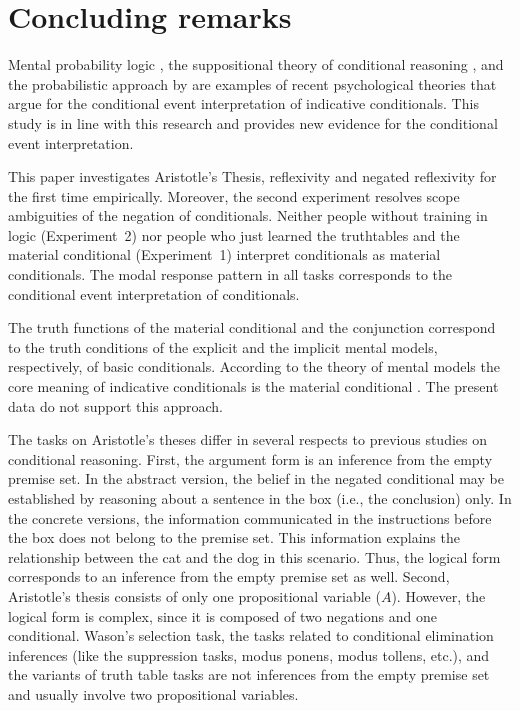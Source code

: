 \documentclass[11pt]{article}
\begin{document}
\section[Concluding remarks]{Concluding remarks}
Mental probability logic \cite{pfeifer05a,pfeifer09b}, the
suppositional theory of conditional reasoning \cite{evans04}, and the
probabilistic approach by  are examples of
recent psychological  theories that argue for the conditional event interpretation of
indicative conditionals. This study is in line with this research and
provides new evidence for the conditional event interpretation.

This paper investigates Aristotle's Thesis, reflexivity and negated
reflexivity for the first time empirically.  Moreover, the second experiment
resolves scope ambiguities of the negation of conditionals.  Neither people
without training in logic (Experiment~2) nor people who just learned
the truthtables and the material conditional (Experiment~1) interpret
conditionals as material conditionals. The modal response pattern in
all tasks corresponds to the conditional event interpretation of
conditionals.


The truth functions of the material conditional and the conjunction
correspond to the truth conditions of the explicit and the implicit
mental models, respectively, of basic conditionals. According to the
theory of mental models  the core meaning of indicative conditionals
is the material conditional \cite{johnsonlaird02}. The present data do not
support this approach.



The tasks on  Aristotle's theses differ in several respects to
previous  studies on conditional reasoning. First, the
argument form is an inference from the empty premise set. In the
abstract version, the belief in the negated conditional may be
established by reasoning about a sentence in the box (i.e., the
conclusion) only. In the concrete versions, the information
communicated in the instructions before the box does not belong to the
premise set. This information explains the relationship between the
cat and the dog in this scenario. Thus, the logical form corresponds
to an inference from the empty premise set as well. Second,
Aristotle's thesis consists of only one propositional variable
($A$). However, the logical form is complex, since it is composed of
two negations and one conditional. Wason's selection task, the tasks
related to conditional elimination inferences (like the suppression
tasks, modus ponens, modus tollens, etc.), and the variants of truth
table tasks are not inferences from the empty premise set and usually
involve two propositional variables.
\end{document}
